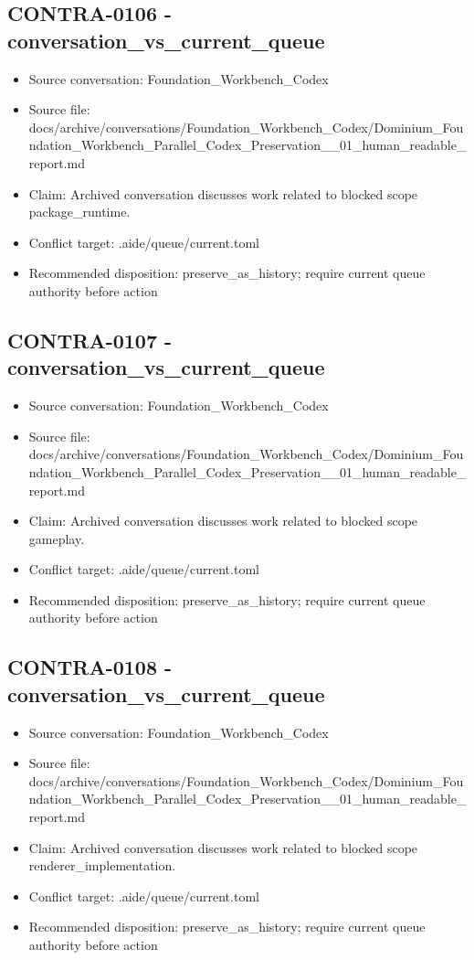 \documentclass[11pt,a4paper]{report}
\begin{document}
\subsection{CONTRA-0106 - conversation\_vs\_current\_queue}

\begin{itemize}
\item Source conversation: Foundation\_Workbench\_Codex
\item Source file: docs/archive/conversations/Foundation\_Workbench\_Codex/Dominium\_Foundation\_Workbench\_Parallel\_Codex\_Preservation\_\_01\_human\_readable\_report.md
\item Claim: Archived conversation discusses work related to blocked scope package\_runtime.
\item Conflict target: .aide/queue/current.toml
\item Recommended disposition: preserve\_as\_history; require current queue authority before action
\end{itemize}

\subsection{CONTRA-0107 - conversation\_vs\_current\_queue}

\begin{itemize}
\item Source conversation: Foundation\_Workbench\_Codex
\item Source file: docs/archive/conversations/Foundation\_Workbench\_Codex/Dominium\_Foundation\_Workbench\_Parallel\_Codex\_Preservation\_\_01\_human\_readable\_report.md
\item Claim: Archived conversation discusses work related to blocked scope gameplay.
\item Conflict target: .aide/queue/current.toml
\item Recommended disposition: preserve\_as\_history; require current queue authority before action
\end{itemize}

\subsection{CONTRA-0108 - conversation\_vs\_current\_queue}

\begin{itemize}
\item Source conversation: Foundation\_Workbench\_Codex
\item Source file: docs/archive/conversations/Foundation\_Workbench\_Codex/Dominium\_Foundation\_Workbench\_Parallel\_Codex\_Preservation\_\_01\_human\_readable\_report.md
\item Claim: Archived conversation discusses work related to blocked scope renderer\_implementation.
\item Conflict target: .aide/queue/current.toml
\item Recommended disposition: preserve\_as\_history; require current queue authority before action
\end{itemize}
\end{document}
